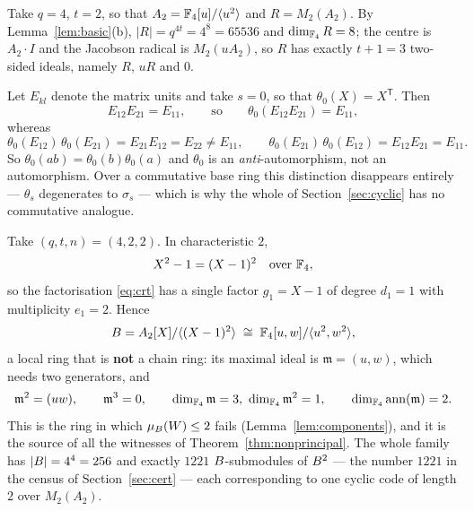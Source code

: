 \begin{example}\label{ex:ring}
Take $q=4$, $t=2$, so that $A_2=\mathbb F_4[u]/\langle u^2\rangle$ and
$R=M_2(A_2)$. By Lemma~\ref{lem:basic}(b),
$|R|=q^{4t}=4^8=65536$ and $\dim_{\mathbb F_4}R=8$; the centre is $A_2\cdot I$ and
the Jacobson radical is $M_2(uA_2)$, so $R$ has exactly $t+1=3$ two-sided
ideals, namely $R$, $uR$ and $0$.

Let $E_{kl}$ denote the matrix units and take $s=0$, so that
$\theta_0(X)=X^{\mathsf T}$. Then
\[
  E_{12}E_{21}=E_{11},\qquad\text{so}\qquad
  \theta_0(E_{12}E_{21})=E_{11},
\]
whereas
\[
  \theta_0(E_{12})\,\theta_0(E_{21})=E_{21}E_{12}=E_{22}\ne E_{11},\qquad
  \theta_0(E_{21})\,\theta_0(E_{12})=E_{12}E_{21}=E_{11}.
\]
So $\theta_0(ab)=\theta_0(b)\theta_0(a)$ and $\theta_0$ is an
\emph{anti}-automorphism, not an automorphism. Over a commutative base ring
this distinction disappears entirely --- $\theta_s$ degenerates to $\sigma_s$
--- which is why the whole of Section~\ref{sec:cyclic} has no commutative
analogue.
\end{example}

\begin{example}\label{ex:crt}
Take $(q,t,n)=(4,2,2)$. In characteristic $2$,
\[
  X^2-1=(X-1)^2\quad\text{over }\mathbb F_4,
\]
so the factorisation \eqref{eq:crt} has a single factor $g_1=X-1$ of degree
$d_1=1$ with multiplicity $e_1=2$. Hence
\[
  B=A_2[X]/\langle (X-1)^2\rangle\;\cong\;\mathbb F_4[u,w]/\langle u^2,w^2\rangle,
\]
a local ring that is \textbf{not} a chain ring: its maximal ideal is
$\mathfrak m=(u,w)$, which needs two generators, and
\[
  \mathfrak m^2=(uw),\qquad \mathfrak m^3=0,\qquad
  \dim_{\mathbb F_4}\mathfrak m=3,\ \dim_{\mathbb F_4}\mathfrak m^2=1,\qquad
  \dim_{\mathbb F_4}\operatorname{ann}(\mathfrak m)=2 .
\]
This is the ring in which $\mu_{B}(W)\le2$ fails
(Lemma~\ref{lem:components}), and it is the source of all the witnesses of
Theorem~\ref{thm:nonprincipal}. The whole family has $|B|=4^4=256$ and
exactly $1221$ $B$-submodules of $B^2$ --- the number $1221$ in the census
of Section~\ref{sec:cert} --- each corresponding to one cyclic code of length
$2$ over $M_2(A_2)$.
\end{example}
